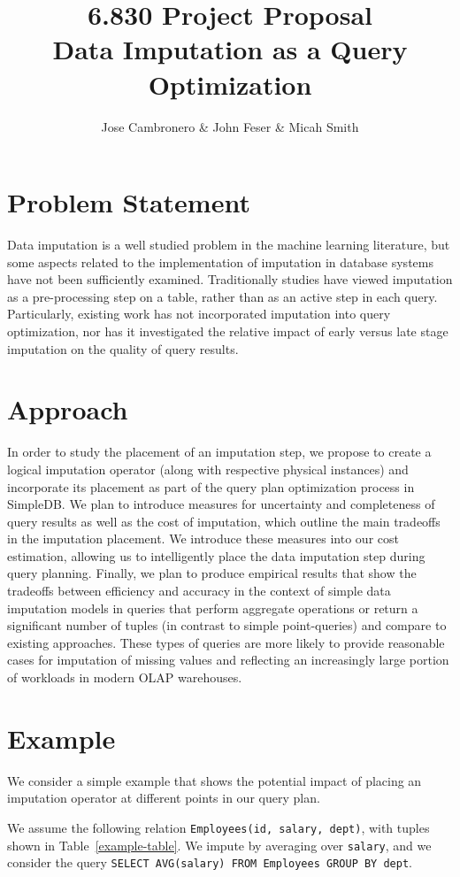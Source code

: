 \documentclass{article}
\title{6.830 Project Proposal \\
  \large Data Imputation as a Query Optimization}
\author{Jose Cambronero \& John Feser \& Micah Smith}
\begin{document}
\maketitle

\section{Problem Statement}
Data imputation is a well studied problem in the machine learning literature, but some aspects related to the implementation of imputation in database systems have not been sufficiently examined. Traditionally studies have viewed imputation as a pre-processing step on a table, rather than as an active step in each query. Particularly, existing work has not incorporated imputation into query optimization, nor has it investigated the relative impact of early versus late stage imputation on the quality of query results.

\section{Approach}
In order to study the placement of an imputation step, we propose to create a logical imputation operator (along with respective physical instances) and incorporate its placement as part of the query plan optimization process in SimpleDB.  We plan to introduce measures for uncertainty and completeness of query results as well as the cost of imputation, which outline the main tradeoffs in the imputation placement. We introduce these measures into our cost estimation, allowing us to intelligently place the data imputation step during query planning. Finally, we plan to produce empirical results that show the tradeoffs between efficiency and accuracy in the context of simple data imputation models in queries that perform aggregate operations or return a significant number of tuples (in contrast to simple point-queries) and compare to existing approaches.  These types of queries are more likely to provide reasonable cases for imputation of missing values and reflecting an increasingly large portion of workloads in modern OLAP warehouses.

\section{Example}
We consider a simple example that shows the potential impact of placing an imputation operator at different points in our query plan.

We assume the following relation \lstinline{Employees(id, salary, dept)}, with tuples shown in Table~\ref{example-table}. We impute by averaging over \lstinline{salary}, and we consider the query \lstinline{SELECT AVG(salary) FROM Employees GROUP BY dept}.
\end{document}
